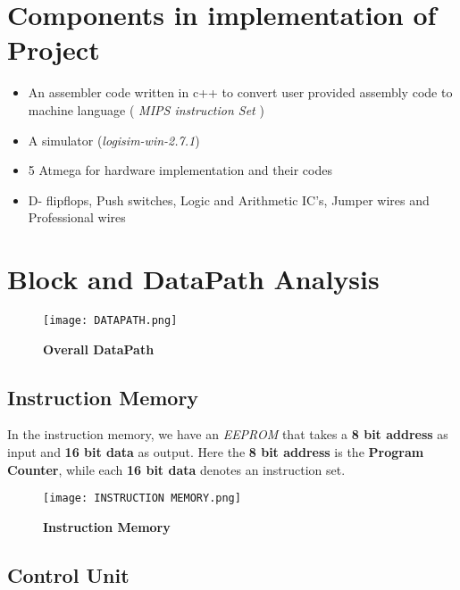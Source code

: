 \documentclass[12pt]{article}
\begin{document}
\section{Components in implementation of Project}

\begin{itemize}
    \item [\ding{227}] An assembler code written in c++ to convert user provided assembly code to machine language ( \textit{MIPS instruction Set} )
    \item [\ding{227}] A simulator (\textit{logisim-win-2.7.1})
    \item[\ding{227}] 5 Atmega for hardware implementation and their codes
    \item[\ding{227}] D- flipflops, Push switches, Logic and Arithmetic IC's, Jumper wires and Professional wires\\
\end{itemize}

\section{Block and DataPath Analysis}

    \begin{figure}[H]
        \centering
        \texttt{[image: DATAPATH.png]}
        \caption{\textbf{Overall DataPath}}
        \label{fig:1}
    \end{figure}

   
\subsection{Instruction Memory}

    In the instruction memory, we have an \textit{EEPROM} that takes a \textbf{8 bit address} as input and \textbf{16 bit data} as output. Here the 
    \textbf{8 bit address} is the \textbf{Program Counter}, while each \textbf{16 bit data } denotes an {instruction set}.

     \begin{figure}[H]
        \centering
        \texttt{[image: INSTRUCTION MEMORY.png]}
        \caption{\textbf{Instruction Memory}}
        \label{fig:2}
    \end{figure}

\subsection{Control Unit}  
\end{document}

